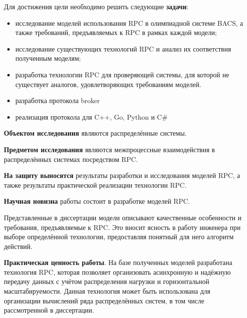 Для достижения цели необходимо решить следующие \textbf{задачи}:
\begin{itemize}
    \item исследование моделей использования RPC в олимпиадной системе BACS,
        а также требований, предъявляемых к RPC в рамках каждой модели;
    \item исследование существующих технологий RPC и анализ их соответствия
        полученным моделям;
    \item разработка технологии RPC для проверяющей системы, для которой
        не существует аналогов, удовлетворяющих требованиям моделей.
    \item разработка протокола broker
    \item реализация протокола для C++, Go, Python и C\#
\end{itemize}



\textbf{Объектом исследования} являются распределённые системы.

\textbf{Предметом исследования} являются межпроцессные взаимодействия
в распределённых системах посредством RPC.

\textbf{На защиту выносятся} результаты разработки и исследования моделей RPC,
а также результаты практической реализации технологии RPC.

\textbf{Научная новизна} работы состоит в разработке моделей RPC.

Представленные в диссертации модели описывают качественные особенности
и требования, предъявляемые к RPC. Это вносит ясность в работу инженера
при выборе определённой технологии, предоставляя понятный для него
алгоритм действий.

\textbf{Практическая ценность работы}. На базе полученных моделей
разработана технология RPC, которая позволяет организовать асинхронную
и надёжную передачу данных с учётом распределения нагрузки и горизонтальной
масштабируемости. Данная технология может быть использована для организации
вычислений ряда распределённых систем, в том числе рассмотренной в диссертации.
